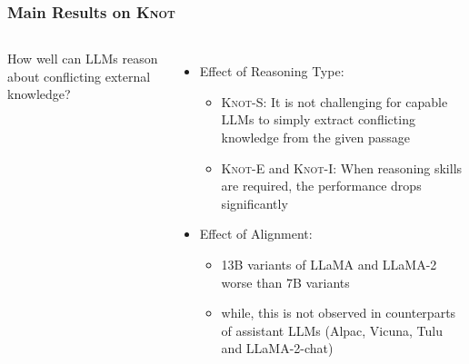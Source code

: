 \documentclass{beamer}
\newcommand{\dataname}{\textsc{Knot}\xspace}
\newcommand{\datanameE}{\textsc{Knot}-E\xspace}
\newcommand{\datanameS}{\textsc{Knot}-S\xspace}
\newcommand{\datanameI}{\textsc{Knot}-I\xspace}
\begin{document}
\begin{frame}
\frametitle{Main Results on \dataname}

\begin{columns}[t]
    How well can LLMs reason about conflicting external knowledge?
    \begin{itemize}
        \item Effect of Reasoning Type:
        \begin{itemize}
            \item \datanameS: It is not challenging for capable LLMs to simply extract conflicting knowledge from the given passage
            \item \datanameE and \datanameI: When reasoning skills are required, the performance drops significantly
        \end{itemize}
        \item Effect of Alignment:
        \begin{itemize}
            \item 13B variants of LLaMA and LLaMA-2 worse than 7B variants
            \item while, this is not observed in counterparts of assistant LLMs (Alpac, Vicuna, Tulu and LLaMA-2-chat)
        \end{itemize}
        

\end{itemize}
\end{columns}
\end{frame}
\end{document}
